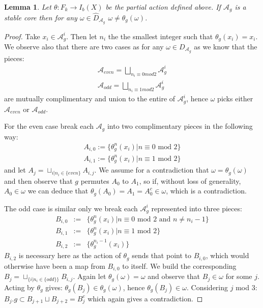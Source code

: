 \documentclass[11pt]{amsart}
\theoremstyle{plain}
\newtheorem{lemma}[theorem]{Lemma}%
\theoremstyle{definition}%
\theoremstyle{remark}%
\begin{document}
\begin{lemma}\label{Lem:StabCore}
Let $\theta: F_{k} \rightarrow I_{b}(X)$ be the partial action defined above. If $\mathcal{A}_{g}$ is a stable core then for any $\omega \in \widehat{D}_{\mathcal{A}_{g}}$ $\omega \not = \theta_{g}(\omega)$.
\end{lemma}
\begin{proof}
Take $x_{i}\in \mathcal{A}^{i}_{g}$. Then let $n_{i}$ the the smallest integer such that $\theta_{g}(x_{i})=x_{i}$. We observe also that there are two cases as for any $\omega \in D_{\mathcal{A}_{g}}$ as we know that the pieces: 
\begin{eqnarray*}
\mathcal{A}_{even}=\bigsqcup_{n_{i}\equiv 0 mod 2} \mathcal{A}_{g}^{i}\\
\mathcal{A}_{odd}=\bigsqcup_{n_{i} \equiv 1 mod 2} \mathcal{A}_{g}^{i}
\end{eqnarray*}
are mutually complimentary and union to the entire of $\mathcal{A}_{g}^{i}$, hence $\omega$ picks either $\mathcal{A}_{even}$ or $\mathcal{A}_{odd}$.

For the even case break each $\mathcal{A}_{g}$ into two complimentary pieces in the following way:
\begin{eqnarray*}
A_{i,0}:= \lbrace \theta_{g}^{n}(x_{i}) |n \equiv 0 \mbox{ mod } 2 \rbrace \\
A_{i,1}:= \lbrace \theta_{g}^{n}(x_{i}) |n \equiv 1 \mbox{ mod } 2 \rbrace
\end{eqnarray*}
and let $A_{j}=\sqcup_{i|n_{i} \in \lbrace even \rbrace}A_{i,j}$. We assume for a contradiction that $\omega=\theta_{g}(\omega)$ and then observe that $g$ permutes $A_{0}$ to $A_{1}$, so if, without loss of generality, $A_{0} \in \omega$ we can deduce that $\theta_{g}(A_{0})=A_{1}=A_{0}^{c}\in \omega$, which is a contradiction. 

The odd case is similar only we break each $\mathcal{A}_{g}^{i}$ represented into three pieces:
\begin{eqnarray*}
B_{i,0} & := & \lbrace \theta_{g}^{n}(x_{i}) |n \equiv 0 \mbox{ mod } 2 \mbox{ and } n\not = n_{i}-1 \rbrace \\
B_{i,1}& := & \lbrace \theta_{g}^{n}(x_{i}) |n \equiv 1 \mbox{ mod } 2 \rbrace \\
B_{i,2}& := & \lbrace \theta_{g}^{n_{i}-1}(x_{i}) \rbrace
\end{eqnarray*}
$B_{i,2}$ is necessary here as the action of $\theta_{g}$ sends that point to $B_{i,0}$, which would otherwise have been a map from $B_{i,0}$ to itself. We build the corresponding $B_{j}=\sqcup_{\lbrace i | n_{i} \in \lbrace odd \rbrace \rbrace} B_{i,j}$. Again let $\theta_{g}(\omega)=\omega$ and observe that $B_{j} \in \omega$ for some $j$. Acting by $\theta_{g}$ gives: $\theta_{g}(B_{j})\in \theta_{g}(\omega)$, hence $\theta_{g}(B_{j})\in \omega$. Considering $j$ mod $3$: $B_{j}.g\subset B_{j+1}\sqcup B_{j+2}= B_{j}^{c}$ which again gives a contradiction.
\end{proof}
\end{document}
